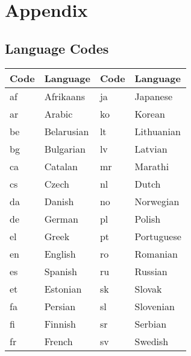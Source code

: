 \documentclass[11pt]{article}
\begin{document}



\newpage

\appendix

\section{Appendix}
\label{sec:appendix}
 \subsection{Language Codes}

\begin{table}[ht]
\begin{tabular}{ll|ll}
\hline
Code & Language                                                 & Code & Language   \\ \hline
af   &  Afrikaans & ja   & Japanese   \\
ar   &  Arabic    & ko   & Korean     \\
be   & Belarusian                                               & lt   & Lithuanian    \\
bg   & Bulgarian                                                & lv   & Latvian    \\
ca   & Catalan                                                  & mr   & Marathi    \\
cs   & Czech                                                    & nl   & Dutch      \\
da   & Danish                                                   & no   & Norwegian  \\
de   & German                                                   & pl   & Polish     \\
el   & Greek                                                    & pt   & Portuguese \\
en   & English                                                  & ro   & Romanian   \\
es   & Spanish                                                  & ru   & Russian    \\
et   & Estonian                                                 & sk   & Slovak     \\
fa   & Persian                                                  & sl   & Slovenian  \\
fi   & Finnish                                                  & sr   & Serbian    \\
fr   & French                                                   & sv   & Swedish    \\

\end{tabular}
\end{table}
\end{document}
